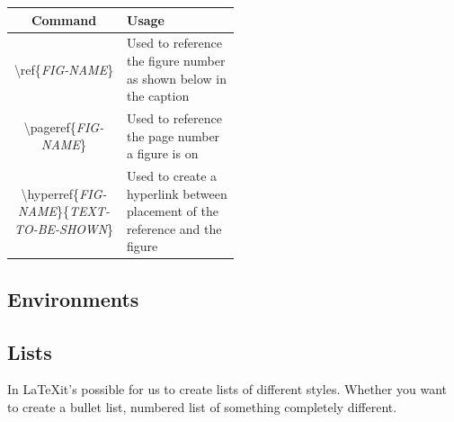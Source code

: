 \documentclass{article}
\newcommand{\bs}[1]{\textbackslash{}#1} %
\begin{document}
\begin{table}[h]
    \centering
    \begin{tabular}{|c|p{0.50\linewidth}|}
        \hline
        \rowcolor{gray!30}
        Command & Usage \\
        \hline
        \bs{ref\{\textit{FIG-NAME}\}} & Used to reference the figure number as shown below in the caption \\
        \hline
        \bs{pageref\{\textit{FIG-NAME}\}} & Used to reference the page number a figure is on \\
        \hline
        \bs{hyperref\{\textit{FIG-NAME}\}\{\textit{TEXT-TO-BE-SHOWN}\}} & Used to create a hyperlink between placement of the reference
         and the figure \\
        \hline
    \end{tabular}
\end{table}



\subsection{Environments}

\subsection{Lists}
In \LaTeX it's possible for us to create lists of different styles. Whether you want to create a bullet list, numbered list of something completely different.
\newpage


\end{document}

